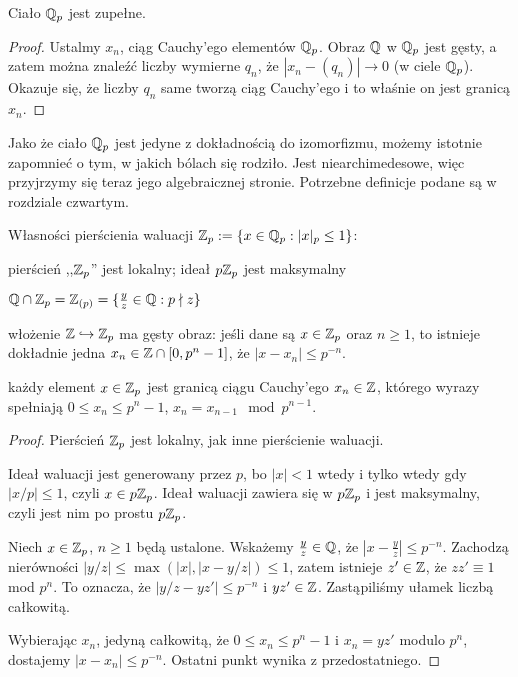 \begin{fakt}
	Ciało $\mathbb Q_p$ jest zupełne.
\end{fakt}

\begin{proof} 
	Ustalmy $x_n$, ciąg Cauchy'ego elementów $\mathbb Q_p$.
	Obraz $\mathbb Q$ w $\mathbb Q_p$ jest gęsty, a zatem można znaleźć liczby wymierne $q_n$, że $|x_n - (q_n)| \to 0$ (w ciele $\mathbb Q_p$).
	Okazuje się, że liczby $q_n$ same tworzą ciąg Cauchy'ego i to właśnie on jest granicą $x_n$.
\end{proof}

Jako że ciało $\mathbb Q_p$ jest jedyne z dokładnością do izomorfizmu, możemy istotnie zapomnieć o tym, w jakich bólach się rodziło.
Jest  niearchimedesowe, więc przyjrzymy się teraz jego algebraicznej stronie.
Potrzebne definicje podane są w rozdziale czwartym.

\begin{fakt}
	Własności pierścienia waluacji $\mathbb Z_p := \{x \in \mathbb Q_p : |x|_p \le 1\}$:
	\begin{enumx}
		\item pierścień ,,$\mathbb Z_p$'' jest lokalny; ideał $p \mathbb Z_p$ jest maksymalny
		\item $\mathbb Q \cap \mathbb Z_p = \mathbb Z_{(p)} = \{\frac yz \in \mathbb Q: p \nmid z\}$
		\item włożenie $\mathbb Z \hookrightarrow \mathbb Z_p$ ma gęsty obraz: jeśli dane są $x \in \mathbb Z_p$ oraz $n \ge 1$, to istnieje dokładnie jedna $x_n \in \mathbb Z \cap [0, p^n- 1]$, że $|x-x_n| \le p^{-n}$.
		\item każdy element $x \in \mathbb Z_p$ jest granicą ciągu Cauchy'ego $x_n \in \mathbb Z$, którego wyrazy spełniają $0 \le x_n \le p^n-1$, $x_n = x_{n-1} \mod {p^{n-1}}$.
	\end{enumx}
\end{fakt}

\begin{proof}
	Pierścień $\mathbb Z_p$ jest lokalny, jak inne pierścienie waluacji.

	Ideał waluacji jest generowany przez $p$, bo $|x| < 1$ wtedy i tylko wtedy gdy $|x/p| \le 1$, czyli $x \in p\mathbb Z_p$.
	Ideał waluacji zawiera się w $p\mathbb Z_p$ i jest maksymalny, czyli jest nim po prostu $p\mathbb Z_p$.

	Niech $x \in \mathbb Z_p$, $n \ge 1$ będą ustalone.
	Wskażemy $\frac yz \in \mathbb Q$, że $|x-\frac yz| \le p^{-n}$.
	Zachodzą nierówności $|y/z| \le \max (|x|, |x-y/z|) \le 1$, zatem istnieje $z' \in \mathbb Z$, że $zz' \equiv 1$ mod $p^n$.
	To oznacza, że $|y/z-yz'| \le p^{-n}$ i $yz' \in \mathbb Z$.
	Zastąpiliśmy ułamek liczbą całkowitą.

	Wybierając $x_n$, jedyną całkowitą, że $0 \le x_n \le p^n-1$ i $x_n = yz'$ modulo $p^n$, dostajemy $|x - x_n| \le p^{-n}$.
	Ostatni punkt wynika z przedostatniego.
\end{proof}

